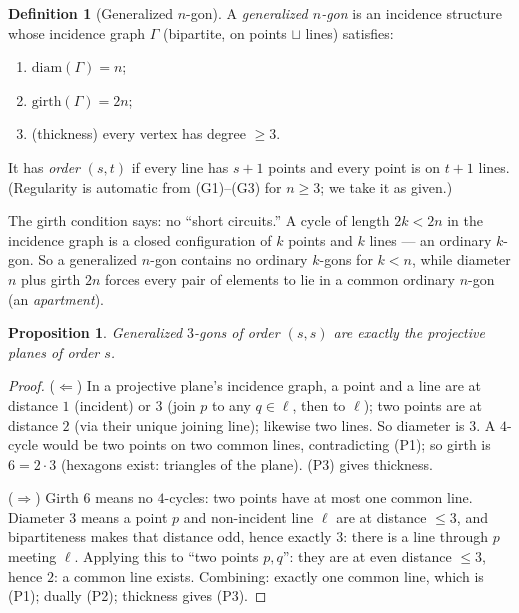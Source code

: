 \documentclass[11pt]{article}
\newtheorem{proposition}[theorem]{Proposition}
\theoremstyle{definition}
\newtheorem{definition}[theorem]{Definition}
\begin{document}
\begin{definition}[Generalized $n$-gon]\label{def:genpoly}
A \emph{generalized $n$-gon} is an incidence structure whose incidence graph
$\Gamma$ (bipartite, on points $\sqcup$ lines) satisfies:
\begin{enumerate}
\item[(G1)] $\mathrm{diam}(\Gamma) = n$;
\item[(G2)] $\mathrm{girth}(\Gamma) = 2n$;
\item[(G3)] (thickness) every vertex has degree $\geq 3$.
\end{enumerate}
It has \emph{order} $(s,t)$ if every line has $s+1$ points and every point is
on $t+1$ lines. (Regularity is automatic from (G1)--(G3) for $n\geq 3$; we
take it as given.)
\end{definition}

The girth condition says: no ``short circuits.'' A cycle of length $2k < 2n$
in the incidence graph is a closed configuration of $k$ points and $k$ lines
--- an ordinary $k$-gon. So a generalized $n$-gon contains no ordinary
$k$-gons for $k < n$, while diameter $n$ plus girth $2n$ forces every pair of
elements to lie in a common ordinary $n$-gon (an \emph{apartment}).

\begin{proposition}\label{prop:plane-is-3gon}
Generalized $3$-gons of order $(s,s)$ are exactly the projective planes of
order $s$.
\end{proposition}

\begin{proof}
($\Leftarrow$) In a projective plane's incidence graph, a point and a line
are at distance $1$ (incident) or $3$ (join $p$ to any $q\in\ell$, then to
$\ell$); two points are at distance $2$ (via their unique joining line);
likewise two lines. So diameter is $3$. A $4$-cycle would be two points on
two common lines, contradicting (P1); so girth is $6 = 2\cdot 3$ (hexagons
exist: triangles of the plane). (P3) gives thickness.

($\Rightarrow$) Girth $6$ means no $4$-cycles: two points have at most one
common line. Diameter $3$ means a point $p$ and non-incident line $\ell$ are
at distance $\leq 3$, and bipartiteness makes that distance odd, hence
exactly $3$: there is a line through $p$ meeting $\ell$. Applying this to
``two points $p,q$'': they are at even distance $\leq 3$, hence $2$: a common
line exists. Combining: exactly one common line, which is (P1); dually (P2);
thickness gives (P3).
\end{proof}
\end{document}
